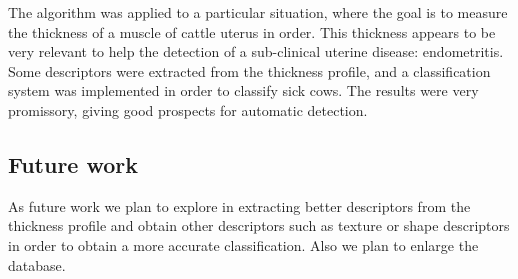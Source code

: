 \documentclass{article}
\begin{document}
The algorithm was applied to a particular situation, where the goal is to measure the thickness of a muscle of cattle uterus in order. This thickness appears to be very relevant to help the detection of a sub-clinical uterine disease: endometritis. Some descriptors were extracted from the thickness profile, and a classification system was implemented in order to classify sick cows. The results were very promissory, giving good prospects for automatic detection.

\subsection{Future work}
\label{ssec:future}
As future work we plan to explore in extracting better descriptors from the thickness profile and obtain other descriptors such as texture or shape descriptors in order to obtain a more accurate classification. Also we plan to enlarge the database.



\end{document}
